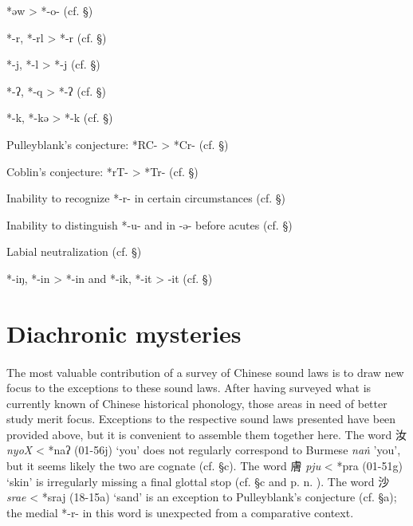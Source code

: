 \begin{description} \item
*əw \textgreater{} *-o- (cf. §)

\item
*-r, *-rl \textgreater{} *-r (cf. §)

\item
*-j, *-l \textgreater{} *-j (cf. §)

\item
*-ʔ, *-q \textgreater{} *-ʔ (cf. §)

\item
*-k, *-kə \textgreater{} *-k (cf. §)

\item
Pulleyblank's conjecture: *RC- \textgreater{} *Cr- (cf. §)

\item
Coblin's conjecture: *rT- \textgreater{} *Tr- (cf. §)

\item
Inability to recognize *-r- in certain circumstances (cf. §)

\item
Inability to distinguish *-u- and in -ə- before acutes (cf. §)
\end{description}

\begin{description} \item
Labial neutralization (cf. §)

\item
*-iŋ, *-in \textgreater{} *-in and *-ik, *-it \textgreater{} -it (cf. §)
\end{description}

\section{Diachronic mysteries}\label{diachronic-mysteries-2}

\paragraph{}The most valuable contribution of a survey of Chinese sound laws is
to draw new focus to the exceptions to these sound laws. After having
surveyed what is currently known of Chinese historical phonology, those
areas in need of better study merit focus. Exceptions to the respective
sound laws presented have been provided above, but it is convenient to
assemble them together here. The word 汝  \emph{nyoX} \textless{} *naʔ
(01-56j) `you' does not regularly correspond to Burmese 
{} \emph{naṅ}
'you', but it seems likely the two are cognate (cf. §c). The word 膚
 \emph{pju} \textless{} *pra (01-51g) `skin' is irregularly missing a
final glottal stop (cf. §c and p. n. ). The word 沙  \emph{srae}
\textless{} *s{}raj (18-15a) `sand' is an exception to Pulleyblank's
conjecture (cf. §a); the medial *-r- in this word is unexpected from a
comparative context.
